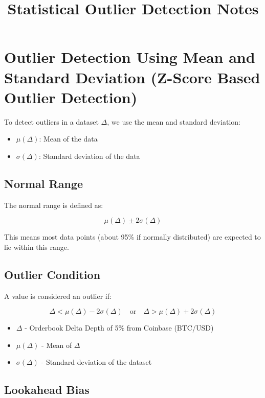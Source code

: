 \documentclass[12pt]{article}
\title{\Huge Statistical Outlier Detection Notes}
\author{}
\date{}
\begin{document}
\maketitle

\section*{Outlier Detection Using Mean and Standard Deviation (Z-Score Based Outlier Detection)}

To detect outliers in a dataset $\Delta$, we use the mean and standard deviation:

\begin{itemize}
    \item $\mu(\Delta)$: Mean of the data
    \item $\sigma(\Delta)$: Standard deviation of the data
\end{itemize}

\subsection*{Normal Range}

The normal range is defined as:

\[
\mu(\Delta) \pm 2\sigma(\Delta)
\]

This means most data points (about 95\% if normally distributed) are expected to lie within this range.

\subsection*{Outlier Condition}

A value is considered an outlier if:



\begin{equation}\label{eq: outlier_detection}
    \Delta < \mu(\Delta) - 2\sigma(\Delta) \quad \text{or} \quad \Delta > \mu(\Delta) + 2\sigma(\Delta)    
\end{equation}


\begin{itemize}
    \item $\Delta$ - Orderbook Delta Depth of 5\% from Coinbase (BTC/USD) 
    \item $\mu(\Delta)$ - Mean of $\Delta$
    \item $\sigma(\Delta)$ - Standard deviation of the dataset
\end{itemize}


\subsection*{Lookahead Bias}
\end{document}
